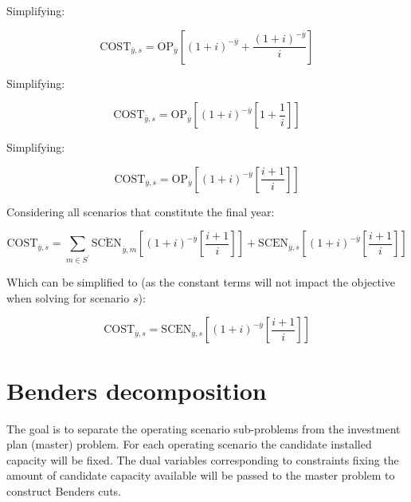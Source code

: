 \documentclass{article}
\newcommand{\sScenarios}{S}
\newcommand{\iYear}{y}
\newcommand{\iYearTerminal}{\overline{\iYear}}
\newcommand{\iScenario}{s}
\newcommand{\iScenarioAlias}{m}
\newcommand{\cOperatingCost}[1][\iYear,\iScenario]{\mathrm{OP}_{#1}}
\newcommand{\cInterestRate}{i}
\newcommand{\cObjectiveFunction}{\mathrm{COST}}
\newcommand{\cOperatingCostScenario}[1][\iYear,\iScenario]{\mathrm{SCEN}_{#1}}
\begin{document}
Simplifying:

\begin{equation}
	\cObjectiveFunction_{\iYearTerminal,\iScenario} = \cOperatingCost[\iYearTerminal]\left[(1+\cInterestRate)^{-\iYearTerminal}  + \frac{(1+\cInterestRate)^{-\iYearTerminal}}{\cInterestRate}\right]
\end{equation}

Simplifying:

\begin{equation}
	\cObjectiveFunction_{\iYearTerminal,\iScenario} = \cOperatingCost[\iYearTerminal] \left[(1+\cInterestRate)^{-\iYearTerminal} \left[1 + \frac{1}{\cInterestRate}\right]\right]
\end{equation}

Simplifying:

\begin{equation}
	\cObjectiveFunction_{\iYearTerminal,\iScenario} = \cOperatingCost[\iYearTerminal] \left[(1+\cInterestRate)^{-\iYearTerminal} \left[ \frac{\cInterestRate + 1}{\cInterestRate}\right]\right]
\end{equation}

Considering all scenarios that constitute the final year:

\begin{equation}
	\cObjectiveFunction_{\iYearTerminal,\iScenario} = \sum\limits_{\iScenarioAlias \in \sScenarios^{\prime}} \overline{\cOperatingCostScenario[]}_{\iYearTerminal,\iScenarioAlias} \left[(1+\cInterestRate)^{-\iYearTerminal} \left[\frac{\cInterestRate + 1}{\cInterestRate}\right]\right] + \cOperatingCostScenario[\iYearTerminal,\iScenario] \left[(1+\cInterestRate)^{-\iYearTerminal} \left[\frac{\cInterestRate + 1}{\cInterestRate}\right]\right] 
\end{equation}

Which can be simplified to (as the constant terms will not impact the objective when solving for scenario $\iScenario$):

\begin{equation}
\cObjectiveFunction_{\iYearTerminal,\iScenario} = \cOperatingCostScenario[\iYearTerminal,\iScenario] \left[(1+\cInterestRate)^{-\iYearTerminal} \left[\frac{\cInterestRate + 1}{\cInterestRate}\right]\right] 
\end{equation}



\section{Benders decomposition}
The goal is to separate the operating scenario sub-problems from the investment plan (master) problem. For each operating scenario the candidate installed capacity will be fixed. The dual variables corresponding to constraints fixing the amount of candidate capacity available will be passed to the master problem to construct Benders cuts.
\end{document}
